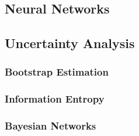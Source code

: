 \subsection{Neural Networks}

\subsection{Uncertainty Analysis}

\subsubsection{Bootstrap Estimation}

\subsubsection{Information Entropy}

\subsubsection{Bayesian Networks}
